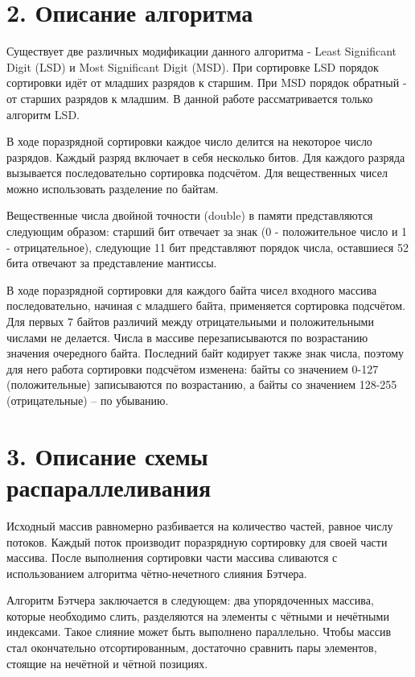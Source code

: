 \documentclass{report}
\begin{document}
    \newpage
    \section*{2. Описание алгоритма}

    \par Существует две различных модификации данного алгоритма - Least Significant Digit (LSD) и Most Significant Digit (MSD). При сортировке LSD порядок сортировки идёт от младших разрядов к старшим. При MSD порядок обратный - от старших разрядов к младшим. В данной работе рассматривается только алгоритм LSD.
    \par В ходе поразрядной сортировки каждое число делится на некоторое число разрядов. Каждый разряд включает в себя несколько битов. Для каждого разряда вызывается последовательно сортировка подсчётом. Для вещественных чисел можно использовать разделение по байтам.
    \par Вещественные числа двойной точности (double) в памяти представляются следующим образом: старший бит отвечает за знак (0 - положительное число и 1 - отрицательное), следующие 11 бит представляют порядок числа, оставшиеся 52 бита отвечают за представление мантиссы.
    \par В ходе поразрядной сортировки для каждого байта чисел входного массива последовательно, начиная с младшего байта, применяется сортировка подсчётом. Для первых 7 байтов различий между отрицательными и положительными числами не делается.
    Числа в массиве перезаписываются по возрастанию значения очередного байта. Последний байт кодирует также знак числа, поэтому для него работа сортировки подсчётом изменена: байты со значением 0-127 (положительные) записываются по возрастанию, а байты со значением 128-255 (отрицательные) -- по убыванию.

    \newpage
    \section*{3. Описание схемы распараллеливания}
    \par Исходный массив равномерно разбивается на количество частей, равное числу потоков. Каждый поток производит поразрядную сортировку для своей части массива. После выполнения сортировки части массива сливаются с использованием алгоритма чётно-нечетного слияния Бэтчера.
    \par Алгоритм Бэтчера заключается в следующем: два упорядоченных массива, которые необходимо слить, разделяются на элементы с чётными и нечётными индексами. Такое слияние может быть выполнено параллельно. Чтобы массив стал окончательно отсортированным, достаточно сравнить пары элементов, стоящие на нечётной и чётной позициях.
    \newpage
\end{document}
